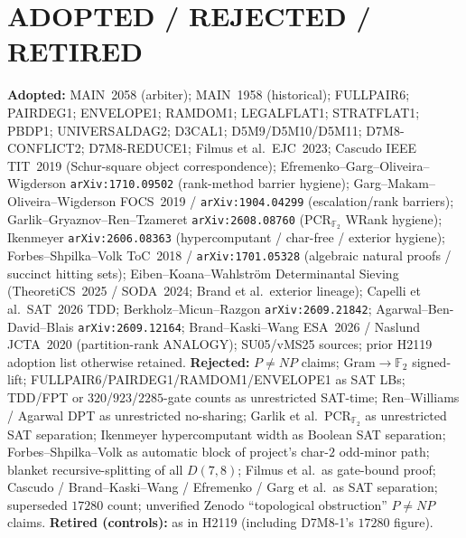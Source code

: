 \documentclass[11pt]{article}
\begin{document}
\section*{ADOPTED / REJECTED / RETIRED}
\textbf{Adopted:} MAIN~2058 (arbiter); MAIN~1958 (historical); FULLPAIR6;
PAIRDEG1; ENVELOPE1; RAMDOM1; LEGALFLAT1; STRATFLAT1; PBDP1; UNIVERSALDAG2;
D3CAL1; D5M9/D5M10/D5M11; D7M8-CONFLICT2; D7M8-REDUCE1; Filmus et al.\ EJC~2023;
Cascudo IEEE TIT~2019 (Schur-square object correspondence);
Efremenko--Garg--Oliveira--Wigderson \texttt{arXiv:1710.09502} (rank-method
barrier hygiene); Garg--Makam--Oliveira--Wigderson FOCS~2019 /
\texttt{arXiv:1904.04299} (escalation/rank barriers);
Garlik--Gryaznov--Ren--Tzameret \texttt{arXiv:2608.08760} (PCR$_{\mathbb F_2}$
WRank hygiene); Ikenmeyer \texttt{arXiv:2606.08363} (hypercomputant / char-free
/ exterior hygiene); Forbes--Shpilka--Volk ToC~2018 / \texttt{arXiv:1701.05328}
(algebraic natural proofs / succinct hitting sets); Eiben--Koana--Wahlstr\"om
Determinantal Sieving (TheoretiCS~2025 / SODA~2024; Brand et al.\ exterior
lineage); Capelli et al.\ SAT~2026 TDD; Berkholz--Micun--Razgon
\texttt{arXiv:2609.21842}; Agarwal--Ben-David--Blais \texttt{arXiv:2609.12164};
Brand--Kaski--Wang ESA~2026 / Naslund JCTA~2020 (partition-rank ANALOGY);
SU05/vMS25 sources; prior H2119 adoption list otherwise retained.
\textbf{Rejected:} $P\neq NP$ claims; Gram$\to\mathbb F_2$ signed-lift;
FULLPAIR6/PAIRDEG1/RAMDOM1/ENVELOPE1 as SAT LBs; TDD/FPT or
$320$/$923$/$2285$-gate counts as unrestricted SAT-time; Ren--Williams /
Agarwal DPT as unrestricted no-sharing; Garlik et al.\ PCR$_{\mathbb F_2}$ as
unrestricted SAT separation; Ikenmeyer hypercomputant width as Boolean SAT
separation; Forbes--Shpilka--Volk as automatic block of project's char-$2$
odd-minor path; blanket recursive-splitting of all $D(7,8)$; Filmus et al.\ as
gate-bound proof; Cascudo / Brand--Kaski--Wang / Efremenko / Garg et al.\ as
SAT separation; superseded $17280$ count; unverified Zenodo ``topological
obstruction'' $P\neq NP$ claims.
\textbf{Retired (controls):} as in H2119 (including D7M8-1's $17280$ figure).
\end{document}
